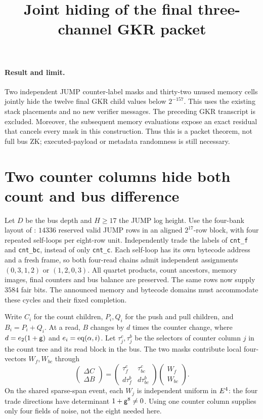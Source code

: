 \documentclass[11pt]{article}
\title{Joint hiding of the final three-channel GKR packet}
\author{}
\date{}
\begin{document}
\maketitle
\vspace{-2em}

\paragraph{Result and limit.} Two independent JUMP counter-label masks and thirty-two unused memory cells jointly hide the twelve final GKR child values below $2^{-157}$. This uses the existing stack placements and no new verifier messages. The preceding GKR transcript is excluded. Moreover, the subsequent memory evaluations expose an exact residual that cancels every mask in this construction. Thus this is a packet theorem, not full bus ZK; executed-payload or metadata randomness is still necessary.

\section{Two counter columns hide both count and bus difference}

Let $D$ be the bus depth and $H\ge17$ the JUMP log height. Use the four-bank layout of : $14336$ reserved valid JUMP rows in an aligned $2^{17}$-row block, with four repeated self-loops per eight-row unit. Independently trade the labels of \texttt{cnt\_f} and \texttt{cnt\_bc}, instead of only \texttt{cnt\_c}. Each self-loop has its own bytecode address and a fresh frame, so both four-read chains admit independent assignments $(0,3,1,2)$ or $(1,2,0,3)$. All quartet products, count ancestors, memory images, final counters and bus balance are preserved. The same rows now supply $3584$ fair bits. The announced memory and bytecode domains must accommodate these cycles and their fixed completion.

Write $C_i$ for the count children, $P_i,Q_i$ for the push and pull children, and $B_i=P_i+Q_i$. At a read, $B$ changes by $d$ times the counter change, where $d=e_2(1+\mathsf{g})$ and $e_i=\operatorname{eq}(\alpha,i)$. Let $\tau^c_j,\tau^b_j$ be the selectors of counter column $j$ in the count tree and its read block in the bus. The two masks contribute local four-vectors $W_f,W_{bc}$ through
\[
 \begin{pmatrix}\Delta C\\\Delta B\end{pmatrix}
 =\begin{pmatrix}\tau^c_f&\tau^c_{bc}\\d\tau^b_f&d\tau^b_{bc}\end{pmatrix}
   \begin{pmatrix}W_f\\W_{bc}\end{pmatrix}.
\]
On the shared sparse-span event, each $W_j$ is independent uniform in $E^4$: the four trade directions have determinant $1+\mathsf{g}^8\ne0$. Using one counter column supplies only four fields of noise, not the eight needed here.
\end{document}
